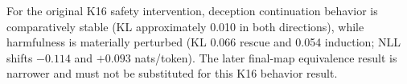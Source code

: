 For the original K16 safety intervention, deception continuation behavior is comparatively stable (KL approximately 0.010 in both directions), while harmfulness is materially perturbed (KL 0.066 rescue and 0.054 induction; NLL shifts $-0.114$ and $+0.093$ nats/token). The later final-map equivalence result is narrower and must not be substituted for this K16 behavior result.
